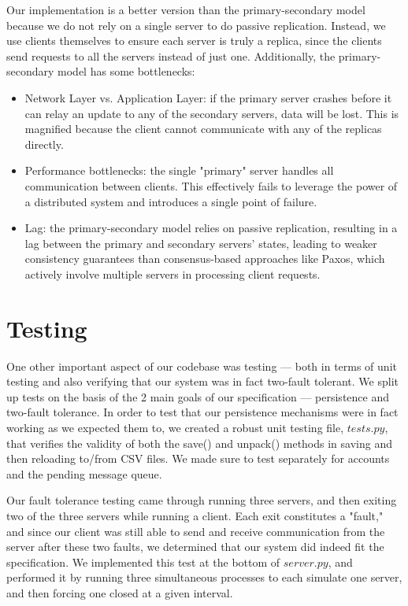 \documentclass[
	a4paper, %
	10pt, %
	unnumberedsections, %
	twoside, %
]{LTJournalArticle}
\begin{document}
Our implementation is a better version than the primary-secondary model because we do not rely on a single server to do passive replication. Instead, we use clients themselves to ensure each server is truly a replica, since the clients send requests to all the servers instead of just one. Additionally, the primary-secondary model has some bottlenecks: 
\begin{itemize}
    \item Network Layer vs. Application Layer: if the primary server crashes before it can relay an update to any of the secondary servers, data will be lost. This is magnified because the client cannot communicate with any of the replicas directly. 
    \item Performance bottlenecks: the single "primary" server handles all communication between clients. This effectively fails to leverage the power of a distributed system and introduces a single point of failure. 
    \item Lag: the primary-secondary model relies on passive replication, resulting in a lag between the primary and secondary servers' states, leading to weaker consistency guarantees than consensus-based approaches like Paxos, which actively involve multiple servers in processing client requests.
\end{itemize}

\section{Testing}

One other important aspect of our codebase was testing --- both in terms of unit testing and also verifying that our system was in fact two-fault tolerant. We split up tests on the basis of the 2 main goals of our specification --- persistence and two-fault tolerance. In order to test that our persistence mechanisms were in fact working as we expected them to, we created a robust unit testing file, $tests.py$, that verifies the validity of both the save() and unpack() methods in saving and then reloading to/from CSV files. We made sure to test separately for accounts and the pending message queue. 

Our fault tolerance testing came through running three servers, and then exiting two of the three servers while running a client. Each exit constitutes a "fault," and since our client was still able to send and receive communication from the server after these two faults, we determined that our system did indeed fit the specification. We implemented this test at the bottom of $server.py$, and performed it by running three simultaneous processes to each simulate one server, and then forcing one closed at a given interval.
\end{document}
